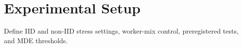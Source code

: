 \section{Experimental Setup}
Define IID and non-IID stress settings, worker-mix control, preregistered tests, and MDE thresholds.
